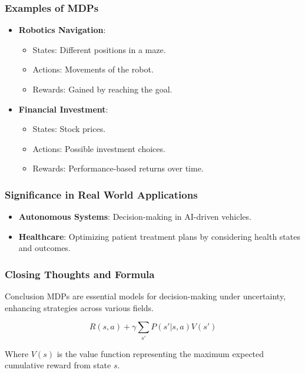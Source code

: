 \documentclass[aspectratio=169]{beamer}
\begin{document}
\begin{frame}[fragile]
    \frametitle{Examples of MDPs}
    \begin{itemize}
        \item \textbf{Robotics Navigation}: 
        \begin{itemize}
            \item States: Different positions in a maze.
            \item Actions: Movements of the robot.
            \item Rewards: Gained by reaching the goal.
        \end{itemize}
        
        \item \textbf{Financial Investment}:
        \begin{itemize}
            \item States: Stock prices.
            \item Actions: Possible investment choices.
            \item Rewards: Performance-based returns over time.
        \end{itemize}
    \end{itemize}
\end{frame}

\begin{frame}[fragile]
    \frametitle{Significance in Real World Applications}
    \begin{itemize}
        \item \textbf{Autonomous Systems}: Decision-making in AI-driven vehicles.
        \item \textbf{Healthcare}: Optimizing patient treatment plans by considering health states and outcomes.
    \end{itemize}
\end{frame}

\begin{frame}[fragile]
    \frametitle{Closing Thoughts and Formula}
    \begin{block}{Conclusion}
        MDPs are essential models for decision-making under uncertainty, enhancing strategies across various fields.
    \end{block}
    
    \begin{equation}
        R(s, a) + \gamma \sum_{s'} P(s' | s, a) V(s')
    \end{equation}
    \begin{block}{Where}
        $V(s)$ is the value function representing the maximum expected cumulative reward from state $s$.
    \end{block}
\end{frame}
\end{document}
